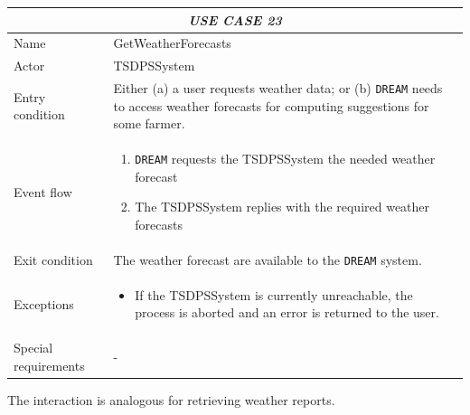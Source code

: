 \documentclass{article}
\begin{document}
\centering
\begin{longtable}{|p{3.5cm}|m{8cm}|}
 \hline
 \multicolumn{2}{|c|}{\cellcolor{white}\emph{USE CASE 23}} \\
 \endfirsthead
 \endhead
 \endfoot
 \endlastfoot
 \hline
 Name & GetWeatherForecasts\\
 \hline
 Actor & TSDPSSystem\\
 \hline
 Entry condition & Either (a) a user requests weather data; or (b) \verb|DREAM| needs to access weather forecasts for computing suggestions for some farmer.\\
 \hline
 Event flow & \begin{enumerate}
    \item \verb|DREAM| requests the TSDPSSystem the needed weather forecast 
    \item The TSDPSSystem replies with the required weather forecasts 
 \end{enumerate}\\
 \hline
 Exit condition & The weather forecast are available to the \verb|DREAM| system.\\
 \hline
 Exceptions & \begin{itemize}
     \item If the TSDPSSystem is currently unreachable, the process is aborted and an error is returned to the user.
 \end{itemize}\\
 \hline
 Special requirements & - \\
 \hline
\end{longtable}

The interaction is analogous for retrieving weather reports.

\end{document}
